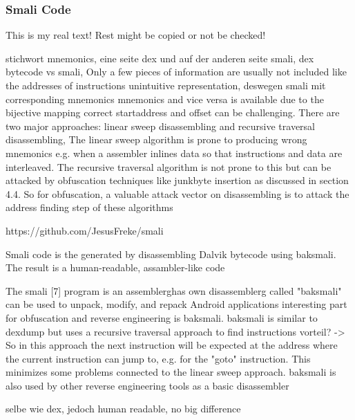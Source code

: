 \subsubsection{Smali Code}\label{subsubsection:tools-baksmali}
This is my real text! Rest might be copied or not be checked!

stichwort mnemonics, eine seite dex und auf der anderen seite smali, dex bytecode vs smali, Only a few pieces of information are usually not included like the addresses of instructions\newline
unintuitive representation, deswegen smali mit corresponding mnemonics\newline
mnemonics and vice versa is available due to the bijective mapping\newline
correct startaddress and offset can be challenging. There are two major approaches: linear sweep disassembling and recursive traversal disassembling, The linear sweep algorithm is prone to producing wrong mnemonics e.g. when a assembler inlines data so that instructions and data are interleaved. The recursive traversal algorithm is not prone to this but can be attacked by obfuscation techniques like junkbyte insertion as discussed in section 4.4. So for obfuscation, a valuable attack vector on disassembling is to attack the address finding step of these algorithms\newline

https://github.com/JesusFreke/smali

Smali code is the generated by disassembling Dalvik bytecode using baksmali. The result is a human-readable, assambler-like code

The smali [7] program is an \gls{assemblerg}has own \gls{disassemblerg} called "baksmali"\newline
can be used to unpack, modify, and repack Android applications\newline
interesting part for obfuscation and reverse engineering is baksmali. baksmali is similar to dexdump but uses a recursive traversal approach to find instructions\newline
vorteil? -> So in this approach the next instruction will be expected at the address where the current instruction can jump to, e.g. for the "goto" instruction. This minimizes some problems connected to the linear sweep approach. baksmali is also used by other reverse engineering tools as a basic disassembler\newline

selbe wie dex, jedoch human readable, no big difference

